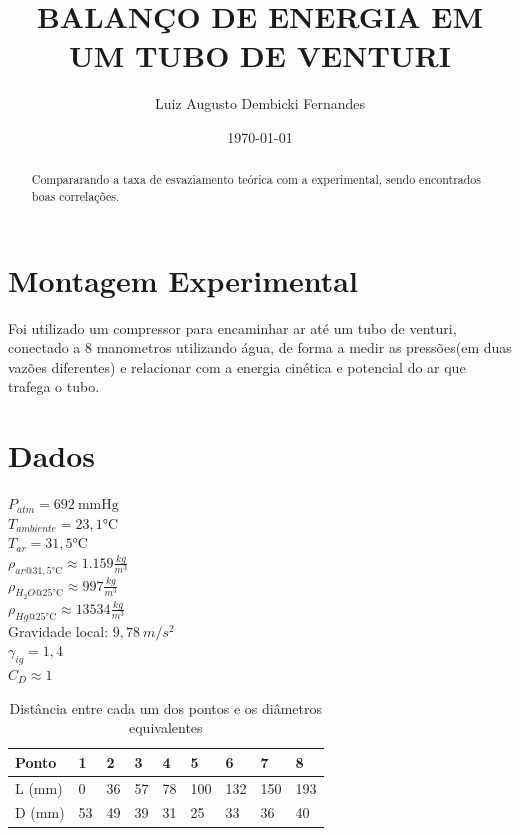 \documentclass[12pt, twoside, a4]{article}
\begin{document}
\title{BALANÇO DE ENERGIA EM UM TUBO DE VENTURI}
\author{Luiz Augusto Dembicki Fernandes}
\date{\today}

\maketitle

\begin{abstract}
Compararando a taxa de esvaziamento teórica com a experimental, sendo encontrados boas correlações. 
\end{abstract}

\section{Montagem Experimental}

\tab  Foi utilizado um compressor para encaminhar ar até um tubo de venturi, 
conectado a 8 manometros utilizando água, de forma a medir as pressões(em duas vazões diferentes)
e relacionar com a energia cinética e potencial do ar que trafega o tubo.

\section{Dados}
$ P_{atm} = 692 \ \si{\mmHg} $ \\
$ T_{ambiente} =  23,1 \si{\celsius} $ \\
$ T_{ar} =  31,5 \si{\celsius} $ \\
$ \rho_{ar@31,5 \si{\celsius}} \approx 1.159 \frac{\si{kg}}{\si{m}^3} $ \\
$ \rho_{H_2O@25 \si{\celsius}} \approx 997 \frac{\si{kg}}{\si{m}^3} $ \\
$ \rho_{Hg@25 \si{\celsius}} \approx 13534 \frac{\si{kg}}{\si{m}^3} $ \\
Gravidade local: $ 9,78 \ m/s^2 $ \\
$ \gamma_{ig} = 1,4 $ \\
$ C_D \approx 1 $
\begin{table}[H]
        \begin{tabular}{|l|l|l|l|l|l|l|l|l|}
        \hline
        Ponto  & 1  & 2  & 3  & 4  & 5   & 6   & 7   & 8   \\ \hline
        L (mm) & 0  & 36 & 57 & 78 & 100 & 132 & 150 & 193 \\ \hline
        D (mm) & 53 & 49 & 39 & 31 & 25  & 33  & 36  & 40  \\ \hline
        \end{tabular}
    \caption{Distância entre cada um dos pontos e os diâmetros equivalentes}
\end{table}
\end{document}

